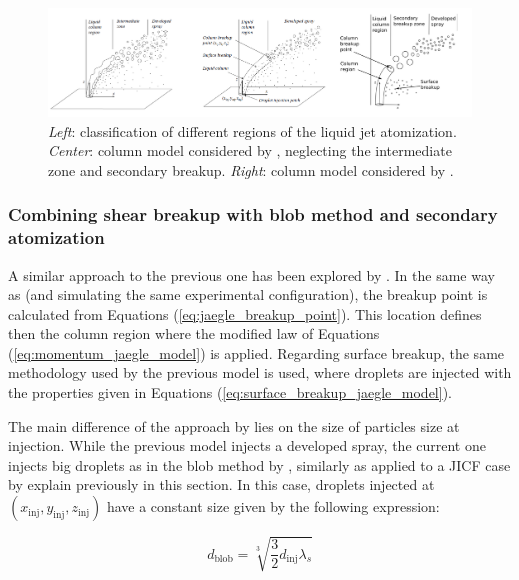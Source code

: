 \begin{figure}[ht]
    \centering
    \includegraphics[width=1.0\textwidth]{./part1_numerical_approaches/figures_ch3/jaegle_senoner_modeling_strategies}
       \centering
    \caption{\textsl{Left}: classification of different regions of the liquid jet atomization. \textsl{Center}:  column model considered by , neglecting the intermediate zone and secondary breakup. \textsl{Right}: column model considered by  .}
    \label{fig:jaegle_senoner_modeling_strategies}
\end{figure}

\subsubsection*{Combining shear breakup with blob method and secondary atomization }

A similar approach to the previous one has been explored by . In the same way as  (and simulating the same experimental configuration), the breakup point is calculated from Equations (\ref{eq:jaegle_breakup_point}). This location defines then the column region where the modified law of Equations (\ref{eq:momentum_jaegle_model}) is applied. Regarding surface breakup, the same methodology used by the previous model is used, where droplets are injected with the properties given in Equations (\ref{eq:surface_breakup_jaegle_model}).

The main difference of the approach by  lies on the size of particles size at injection. While the previous model injects a developed spray, the current one injects big droplets as in the blob method by , similarly as applied to a JICF case by  explain previously in this section. In this case, droplets injected at $\left( x_\mathrm{inj}, y_\mathrm{inj}, z_\mathrm{inj} \right)$ have a constant size given by the following expression:

\begin{equation}
d_\mathrm{blob} = \sqrt[3]{\frac{3}{2} d_\mathrm{inj} \lambda_s}
\end{equation}

